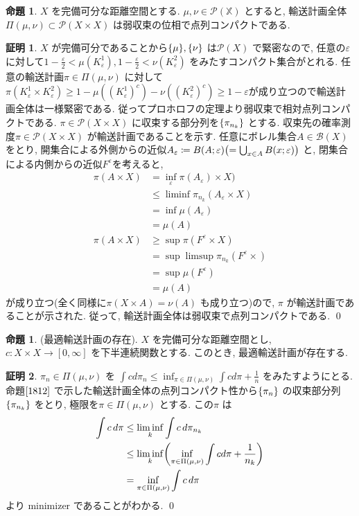 \documentclass[10pt, fleqn, label-section=none, titlepage]{bxjsarticle}
\theoremstyle{definition}
\newtheorem{prop}[dfn]{命題}
\newtheorem*{pf*}{証明}
\newcommand{\veps}{\varepsilon}
\newcommand{\paren}[1]{\mleft( #1\mright )}
\newcommand{\cbra}[1]{\mleft\{#1\mright\}}
\renewcommand{\;}{\, ; \,}
\renewcommand{\d}{\, {d}}
\begin{document}
\begin{prop}
\label{1812}
$X$ を完備可分な距離空間とする. $\mu, \nu \in \mathcal{P}(\mathbb X)$ とすると, 輸送計画全体$\Pi (\mu, \nu)\subset\mathcal{P}(X\times X)$ は弱収束の位相で点列コンパクトである. 
\end{prop}
\begin{pf*}
$X$ が完備可分であることから$\cbra{\mu}, \cbra{\nu}$ は$\mathcal P (X)$ で緊密なので, 任意の$\veps$ に対して$1 - \frac{\veps}{2} < \mu (K_\veps ^1) , 1 - \frac{\veps}{2} < \nu (K_\veps ^2)$ をみたすコンパクト集合がとれる. 任意の輸送計画$\pi \in \Pi (\mu, \nu)$ に対して$\pi (K_\veps ^1 \times K_\veps ^2) \geq 1 - \mu((K_\veps ^1) ^c) - \nu((K_\veps ^2 )^c) \geq 1 -\veps $が成り立つので輸送計画全体は一様緊密である. 従ってプロホロフの定理より弱収束で相対点列コンパクトである. $\pi \in \mathcal P (X \times X)$ に収束する部分列を$\cbra{\pi_{n_k}}$ とする. 収束先の確率測度$\pi \in \mathcal P(X \times X)$ が輸送計画であることを示す. 任意にボレル集合$A \in \mathcal B (X)$ をとり, 開集合による外側からの近似$A_\veps \coloneqq B(A; \veps ) \paren{= \bigcup_{x \in A} B(x; \veps)}$ と, 閉集合による内側からの近似$F^\veps$を考えると,
\begin{align*} \pi (A \times X) &= \inf_\veps \pi (A_\veps) \times X) \\
&\leq \liminf \pi_{n_k}(A_\veps \times X) \\
&= \inf \mu(A_\veps ) \\
&= \mu(A) \\
\pi (A \times X) &\geq \sup \pi(F^\veps \times X) \\
&= \sup \limsup \pi_{n_k} (F ^\veps \times) \\
&= \sup \mu (F^\veps) \\
&= \mu(A)  
\end{align*}
が成り立つ(全く同様に$\pi (X \times A) = \nu(A)$ も成り立つ)ので, $\pi$ が輸送計画であることが示された. 従って, 輸送計画全体は弱収束で点列コンパクトである.  
\qed
\end{pf*}

\newpage
\begin{prop}(最適輸送計画の存在).
$X$ を完備可分な距離空間とし, $c: X \times X \rightarrow [0, \infty]$ を下半連続関数とする. このとき, 最適輸送計画が存在する.
\end{prop}
\begin{pf*}
$\pi_n \in \Pi(\mu, \nu)$ を $\int c d\pi_n \leq \inf_{\pi \in \Pi (\mu, \nu) } \int c d\pi + \frac{1}{n}$ をみたすようにとる. 命題$\ref{1812}$ で示した輸送計画全体の点列コンパクト性から$\cbra{\pi_n}$ の収束部分列$\cbra{\pi_{n_k}}$ をとり, 極限を$\pi \in \Pi(\mu, \nu)$ とする. この$\pi$ は
\begin{align*} \int c \d\pi &\leq \liminf_k \int c \d\pi_{n_k} \\
 &\leq \liminf_k \paren{\inf_{\pi \in \Pi (\mu,\nu)} \int c d\pi + \frac{1}{n_k} } \\
 &= \inf_{\pi \in \Pi (\mu,\nu)} \int c \d\pi
 \end{align*}
より minimizer であることがわかる.
\qed
\end{pf*}
\end{document}
